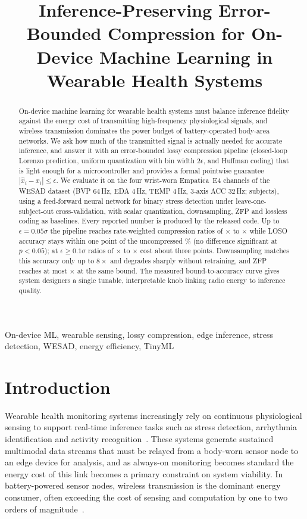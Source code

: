 \documentclass[conference]{IEEEtran}
\begin{document}
\title{Inference-Preserving Error-Bounded Compression for On-Device Machine Learning in Wearable Health Systems}
\author{}
\maketitle

\begin{abstract}
On-device machine learning for wearable health systems must balance inference fidelity against the energy cost of transmitting high-frequency physiological signals, and wireless transmission dominates the power budget of battery-operated body-area networks. We ask how much of the transmitted signal is actually needed for accurate inference, and answer it with an error-bounded lossy compression pipeline (closed-loop Lorenzo prediction, uniform quantization with bin width $2\epsilon$, and Huffman coding) that is light enough for a microcontroller and provides a formal pointwise guarantee $|\hat{x}_i-x_i|\le\epsilon$. We evaluate it on the four wrist-worn Empatica~E4 channels of the WESAD dataset (BVP 64\,Hz, EDA 4\,Hz, TEMP 4\,Hz, 3-axis ACC 32\,Hz; \nSubjects{} subjects), using a feed-forward neural network for binary stress detection under leave-one-subject-out cross-validation, with scalar quantization, downsampling, ZFP and lossless coding as baselines. Every reported number is produced by the released code. Up to $\epsilon=0.05\sigma$ the pipeline reaches rate-weighted compression ratios of \ratioEa$\times$ to \ratioEd$\times$ while LOSO accuracy stays within one point of the uncompressed \rawAcc\% (no difference significant at $p<0.05$); at $\epsilon\ge0.1\sigma$ ratios of \ratioEe$\times$ to \ratioEf$\times$ cost about three points. Downsampling matches this accuracy only up to $8\times$ and degrades sharply without retraining, and ZFP reaches at most \zfpRatioMax$\times$ at the same bound. The measured bound-to-accuracy curve gives system designers a single tunable, interpretable knob linking radio energy to inference quality.
\end{abstract}

\begin{IEEEkeywords}
On-device ML, wearable sensing, lossy compression, edge inference, stress detection, WESAD, energy efficiency, TinyML
\end{IEEEkeywords}

\section{Introduction}
Wearable health monitoring systems increasingly rely on continuous physiological sensing to support real-time inference tasks such as stress detection, arrhythmia identification and activity recognition~\cite{shi2016}. These systems generate sustained multimodal data streams that must be relayed from a body-worn sensor node to an edge device for analysis, and as always-on monitoring becomes standard the energy cost of this link becomes a primary constraint on system viability. In battery-powered sensor nodes, wireless transmission is the dominant energy consumer, often exceeding the cost of sensing and computation by one to two orders of magnitude~\cite{anastasi2009}.
\end{document}
